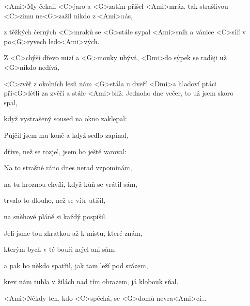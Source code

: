 
\zs
<Ami>My čekali <C>jaro a <G>zatím přišel <Ami>mráz,
tak strašlivou <C>zimu ne<G>zažil nikdo z <Ami>nás,

z těžkých černých <C>mraků se <G>stále sypal <Ami>sníh
a vánice <C>sílí v po<G>ryvech ledo<Ami>vých.

Z <C>chýší dřevo mizí a <G>mouky ubývá,
<Dmi>do sýpek se raději už <G>nikdo nedívá,

<C>zvěř z okolních lesů nám <G>stála u dveří
<Dmi>a hladoví ptáci při<G>létli za zvěří a stále <Ami>blíž.
\ks
\zs
Jednoho dne večer, to už jsem skoro spal,

když vystrašený soused na okno zaklepal:


Půjčil jsem mu koně a když sedlo zapínal,

dříve, než se rozjel, jsem ho ještě varoval:

\ks
\zs
Na to strašné ráno dnes nerad vzpomínám,

na tu hroznou chvíli, když kůň se vrátil sám,

trvalo to dlouho, než se vítr utišil,

na sněhové pláně si každý pospíšil.

Jeli jsme tou zkratkou až k místu, které znám,

kterým bych v té bouři nejel ani sám,

a pak ho někdo spatřil, jak tam leží pod srázem,

krev nám tuhla v žilách nad tím obrazem, já klobouk sňal.
\ks

<Ami>Někdy ten, kdo <C>spěchá, se <G>domů nevra<Ami>cí...
\kp





